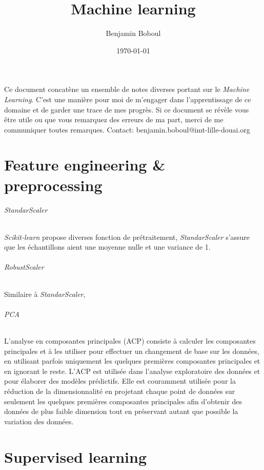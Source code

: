 \documentclass[../../cs-notes.tex]{subfiles}
\title{Machine learning}
\author{Benjamin Boboul}
\date{\today}
\begin{document}
	\maketitle

	Ce document concat\`ene un ensemble de notes diverses portant sur le \textit{Machine Learning}.
	C'est une manière pour moi de m'engager dans l'apprentissage de ce domaine et de garder une trace de mes progrès.
	Si ce document se r\'ev\`ele vous être utile ou que vous remarquez des erreurs de ma part, merci de me communiquer toutes remarques.
	Contact: benjamin.boboul@imt-lille-douai.org

	\part{Feature engineering \& preprocessing}

	\paragraph{StandarScaler} \textit{Scikit-learn} propose diverses fonction de prétraitement, \textit{StandarScaler} s'assure que les échantillons aient une moyenne nulle et une variance de 1.

	\paragraph{RobustScaler} Similaire à \textit{StandarScaler}, 

	\paragraph{PCA} L'analyse en composantes principales (ACP) consiste à calculer les composantes principales et à les utiliser pour effectuer un changement de base sur les données, en utilisant parfois uniquement les quelques premières composantes principales et en ignorant le reste. 
	L'ACP est utilisée dans l'analyse exploratoire des données et pour élaborer des modèles prédictifs.
	Elle est couramment utilisée pour la réduction de la dimensionnalité en projetant chaque point de données sur seulement les quelques premières composantes principales afin d'obtenir des données de plus faible dimension tout en préservant autant que possible la variation des données.

	\part{Supervised learning}
\end{document}
